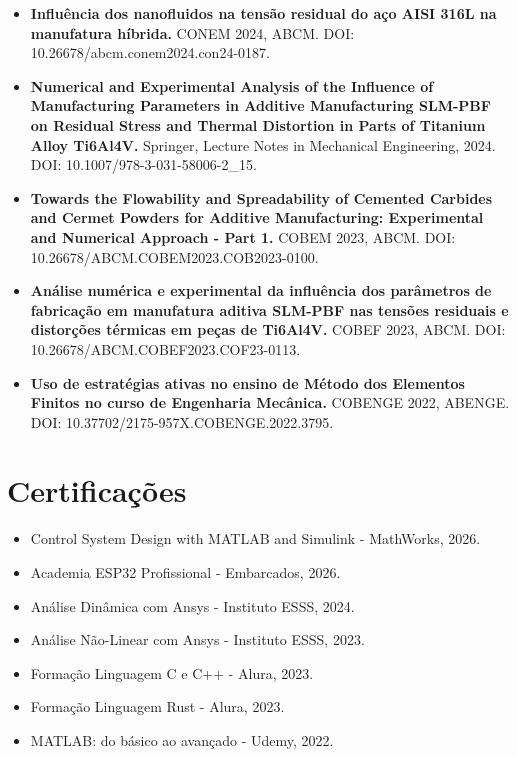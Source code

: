 \documentclass[10pt,a4paper]{article}
\begin{document}
\begin{itemize}
  \item \textbf{Influência dos nanofluidos na tensão residual do aço AISI 316L
        na manufatura híbrida.} CONEM 2024, ABCM. DOI:
        10.26678/abcm.conem2024.con24-0187.
  \item \textbf{Numerical and Experimental Analysis of the Influence of
        Manufacturing Parameters in Additive Manufacturing SLM-PBF on Residual
        Stress and Thermal Distortion in Parts of Titanium Alloy Ti6Al4V.}
        Springer, Lecture Notes in Mechanical Engineering, 2024. DOI:
        10.1007/978-3-031-58006-2\_15.
  \item \textbf{Towards the Flowability and Spreadability of Cemented
        Carbides and Cermet Powders for Additive Manufacturing: Experimental
        and Numerical Approach - Part 1.} COBEM 2023, ABCM. DOI:
        10.26678/ABCM.COBEM2023.COB2023-0100.
  \item \textbf{Análise numérica e experimental da influência dos parâmetros de
        fabricação em manufatura aditiva SLM-PBF nas tensões residuais e
        distorções térmicas em peças de Ti6Al4V.} COBEF 2023, ABCM. DOI:
        10.26678/ABCM.COBEF2023.COF23-0113.
  \item \textbf{Uso de estratégias ativas no ensino de Método dos Elementos
        Finitos no curso de Engenharia Mecânica.} COBENGE 2022, ABENGE. DOI:
        10.37702/2175-957X.COBENGE.2022.3795.
\end{itemize}

\section{Certificações}

\begin{itemize}
  \item Control System Design with MATLAB and Simulink - MathWorks, 2026.
  \item Academia ESP32 Profissional - Embarcados, 2026.
  \item Análise Dinâmica com Ansys - Instituto ESSS, 2024.
  \item Análise Não-Linear com Ansys - Instituto ESSS, 2023.
  \item Formação Linguagem C e C++ - Alura, 2023.
  \item Formação Linguagem Rust - Alura, 2023.
  \item MATLAB: do básico ao avançado - Udemy, 2022.
\end{itemize}
\end{document}
